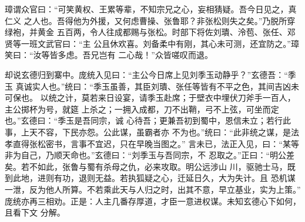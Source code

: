 璋谓众官曰：“可笑黄权、王累等辈，不知宗兄之心，妄相猜疑。吾今日见之，真仁义
之人也。吾得他为外援，又何虑曹操、张鲁耶？非张松则失之矣。”乃脱所穿绿袍，并黄金
五百两，令人往成都赐与张松。时部下将佐刘璝、泠苞、张任、邓贤等一班文武官曰：“主
公且休欢喜。刘备柔中有刚，其心未可测，还宜防之。”璋笑曰：“汝等皆多虑。吾兄岂有
二心哉！”众皆嗟叹而退。

却说玄德归到寨中。庞统入见曰：“主公今日席上见刘季玉动静乎？”玄德吾：“季玉
真诚实人也。”统曰：“季玉虽善，其臣刘璝、张任等皆有不平之色，其间吉凶未可保也。
以统之计，莫若来日设宴，请季玉赴席；于壁衣中埋伏刀斧手一百人，主公掷杯为号，就筵
上杀之；一拥入成都，刀不出鞘，弓不上弦，可坐而定也。”玄德曰：“季玉是吾同宗，诚
心待吾；更兼吾初到蜀中，恩信未立；若行此事，上天不容，下民亦怨。公此谋，虽霸者亦
不为也。”统曰：“此非统之谋，是法孝直得张松密书，言事不宜迟，只在早晚当图之。”
言未已，法正入见，曰：“某等非为自己，乃顺天命也。”玄德曰：“刘季玉与吾同宗，不
忍取之。”正曰：“明公差矣。若不如此，张鲁与蜀有杀母之仇，必来攻取。明公远涉山
川，驱驰士马，既到此地，进则有功，退则无益。若执狐疑之心，迁延日久，大为失计。且
恐机谋一泄，反为他人所算。不若乘此天与人归之时，出其不意，早立基业，实为上策。”
庞统亦再三相劝。正是：人主几番存厚道，才臣一意进权谋。未知玄德心下如何，且看下文
分解。